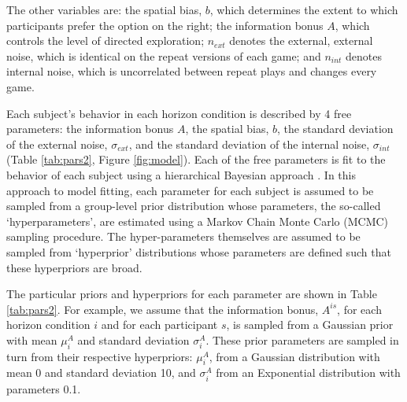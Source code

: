 \documentclass[12pt]{article}
\begin{document}
	The other variables are: the spatial bias, $b$, which determines the extent to which participants prefer the option on the right; the information bonus $A$, which controls the level of directed exploration; $n_{ext}$ denotes the external, external noise, which is identical on the repeat versions of each game; and $n_{int}$ denotes internal noise, which is uncorrelated between repeat plays and changes every game.
	
	Each subject's behavior in each horizon condition is described by 4 free parameters: the information bonus $A$, the spatial bias, $b$, the standard deviation of the external noise, $\sigma_{ext}$, and the standard deviation of the internal noise, $\sigma_{int}$ (Table \ref{tab:pars2}, Figure \ref{fig:model}). Each of the free parameters is fit to the behavior of each subject using a hierarchical Bayesian approach \citep{hbm1}.  In this approach to model fitting, each parameter for each subject is assumed to be sampled from a group-level prior distribution whose parameters, the so-called `hyperparameters', are estimated using a Markov Chain Monte Carlo (MCMC) sampling procedure. The hyper-parameters themselves are assumed to be sampled from `hyperprior' distributions whose parameters are defined such that these hyperpriors are broad.  
	
	The particular priors and hyperpriors for each parameter are shown in Table \ref{tab:pars2}. For example, we assume that the information bonus, $A^{is}$, for each horizon condition $i$ and for each participant $s$, is sampled from a Gaussian prior with mean $\mu^{A}_{i}$ and standard deviation $\sigma_{i}^A$. These prior parameters are sampled in turn from their respective hyperpriors: $\mu_{i}^{A}$, from a Gaussian distribution with mean 0 and standard deviation 10, and $\sigma_{i}^A$ from an Exponential distribution with parameters 0.1.
	
\end{document}
